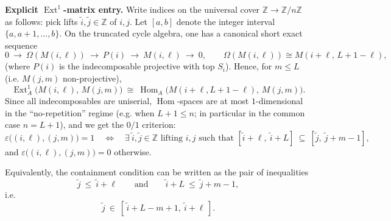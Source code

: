 \documentclass{article}
\newcommand{\Hom}{\operatorname{Hom}}
\newcommand{\Ext}{\operatorname{Ext}}
\theoremstyle{definition}
\begin{document}
\medskip

\noindent
\textbf{Explicit $\Ext^1$-matrix entry.}
Write indices on the universal cover $\mathbb{Z}\to \mathbb{Z}/n\mathbb{Z}$ as follows: pick lifts
$\tilde i,\tilde j\in\mathbb{Z}$ of $i,j$.
Let $[a,b]$ denote the integer interval $\{a,a+1,\dots,b\}$.
On the truncated cycle algebra, one has a canonical short exact sequence
\[
0\ \longrightarrow\ \Omega(M(i,\ell))\ \longrightarrow\ P(i)\ \longrightarrow\ M(i,\ell)\ \longrightarrow\ 0,
\qquad
\Omega(M(i,\ell))\cong M(i+\ell,\,L+1-\ell),
\]
(where $P(i)$ is the indecomposable projective with top $S_i$). Hence, for $m\le L$ (i.e. $M(j,m)$ non-projective),
\[
\Ext^1_A\!\big(M(i,\ell),\,M(j,m)\big)\ \cong\ \Hom_A\!\big(M(i+\ell,L+1-\ell),\,M(j,m)\big).
\]
Since all indecomposables are uniserial, $\Hom$-spaces are at most $1$-dimensional in the ``no-repetition'' regime
(e.g. when $L+1\le n$; in particular in the common case $n=L+1$), and we get the $0/1$ criterion:
\[
\varepsilon\big((i,\ell),(j,m)\big)=1
\quad\Longleftrightarrow\quad
\exists\ \tilde i,\tilde j\in\mathbb{Z}\text{ lifting }i,j\text{ such that }
[\tilde i+\ell,\ \tilde i+L]\ \subseteq\ [\tilde j,\ \tilde j+m-1],
\]
and $\varepsilon\big((i,\ell),(j,m)\big)=0$ otherwise.

Equivalently, the containment condition can be written as the pair of inequalities
\[
\tilde j\ \le\ \tilde i+\ell
\qquad\text{and}\qquad
\tilde i+L\ \le\ \tilde j+m-1,
\]
i.e.
\[
\tilde j\ \in\ [\,\tilde i+L-m+1,\ \tilde i+\ell\,].
\]

\medskip
\end{document}
